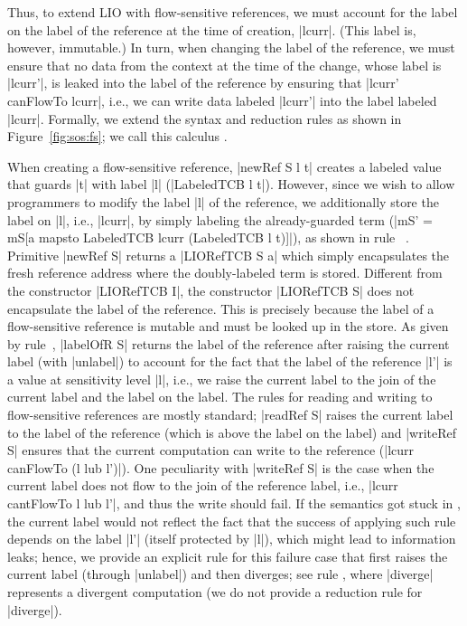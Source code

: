 Thus, to extend LIO with flow-sensitive references, we must account for the label
on the label of the reference at the time of creation, |lcurr|.
%
(This label is, however, immutable.)
%
In turn, when changing the label of the reference, we must ensure that no data
from the context at the time of the change, whose label is |lcurr'|, is leaked
into the label of the reference by ensuring that |lcurr' canFlowTo lcurr|,
i.e., we can write data labeled |lcurr'| into the label labeled |lcurr|.
%
Formally, we extend the \lio{} syntax and reduction rules as shown in
Figure~\ref{fig:sos:fs}; we call this calculus \liofs{}.

When creating a flow-sensitive reference, |newRef S l t| creates a labeled
value that guards |t| with label |l| (|LabeledTCB l t|).
%
However, since we wish to allow programmers to modify the label |l| of the
reference, we additionally store the label on |l|, i.e., |lcurr|, by simply
labeling the already-guarded term (|mS' = mS[a mapsto LabeledTCB lcurr
(LabeledTCB l t)]|), as shown in rule~ .
%
Primitive |newRef S| returns a |LIORefTCB S a| which simply encapsulates the fresh
reference address where the doubly-labeled term is stored.
%
Different from the constructor |LIORefTCB I|,  the constructor |LIORefTCB S|
does not encapsulate the label of the reference. 
%
This is precisely because the label of a flow-sensitive reference is 
mutable and must be looked up in the store.
%
As given by rule~, |labelOfR S| returns the label of the
reference after raising the current label (with |unlabel|) to account for the
fact that the label of the reference |l'| is a value at sensitivity level |l|,
i.e., we raise the current label to the join of the current label and the label
on the label.
%
The rules for reading and writing to flow-sensitive references are mostly
standard; |readRef S| raises the current label to the label of the reference
(which is above the label on the label) and |writeRef S| ensures that the
current computation can write to the reference (|lcurr canFlowTo (l lub l')|).
%
One peculiarity with |writeRef S| is the case when the current label does not
flow to the join of the reference label, i.e., |lcurr cantFlowTo l lub l'|, and
thus the write should fail.
%
If the semantics got stuck in , the current label would
not reflect the fact that the success of applying such rule depends on the
label |l'| (itself protected by |l|), which might lead to information leaks;
hence, we provide an explicit rule for this failure case that first raises the
current label (through |unlabel|) and then diverges; see rule
, where |diverge| represents a divergent computation
(we do not provide a reduction rule for |diverge|).

